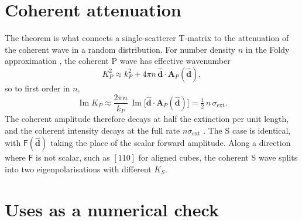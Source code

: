\documentclass[11pt,a4paper]{article}
\newcommand{\bA}{\mathbf{A}}
\newcommand{\bd}{\hat{\mathbf{d}}}
\newcommand{\sext}{\sigma_{\mathrm{ext}}}
\newcommand{\kp}{k_{P}}
\DeclareMathOperator{\Imag}{Im}
\begin{document}
\section{Coherent attenuation}
\label{sec:foldy}

The theorem is what connects a single-scatterer T-matrix to the
attenuation of the coherent wave in a random distribution. For number
density $n$ in the Foldy approximation \citep{Foldy1945,Lax1951,Martin2006},
the coherent P wave has effective wavenumber
\begin{equation}
  K_P^{2} \approx \kp^{2} + 4\pi n\,\bd\cdot\bA_P(\bd),
  \label{eq:foldy}
\end{equation}
so to first order in $n$,
\begin{equation}
  \Imag K_P \approx \frac{2\pi n}{\kp}\,\Imag\bigl[\bd\cdot\bA_P(\bd)\bigr]
  = \tfrac12\, n\,\sext .
  \label{eq:atten}
\end{equation}
The coherent amplitude therefore decays at half the extinction per unit
length, and the coherent intensity decays at the full rate
$n\sext$ \citep{SatoFehlerMaeda2012}. The S case is identical,
with $\mathsf{F}(\bd)$ taking the place of the scalar forward amplitude.
Along a direction where $\mathsf{F}$ is not scalar, such as $[110]$ for
aligned cubes, the coherent S wave splits into two eigenpolarisations
with different $K_S$.

\section{Uses as a numerical check}
\label{sec:check}
\end{document}
